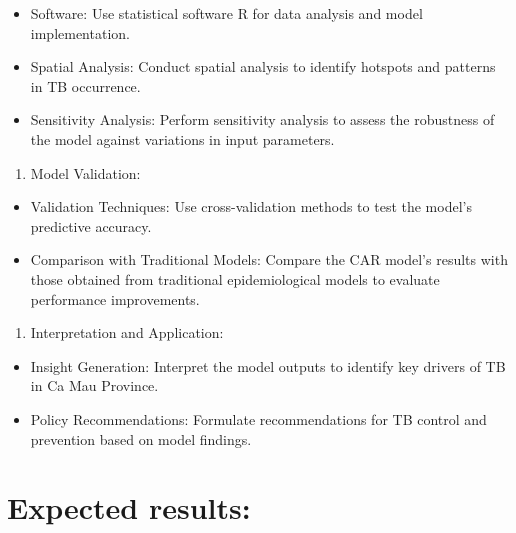 \documentclass[
  number,
  preprint,
  3p]{elsarticle}
\providecommand{\tightlist}{%
  \setlength{\itemsep}{0pt}\setlength{\parskip}{0pt}}\usepackage{longtable,booktabs,array}
\begin{document}
\begin{itemize}
\tightlist
\item
  Software: Use statistical software R for data analysis and model
  implementation.
\item
  Spatial Analysis: Conduct spatial analysis to identify hotspots and
  patterns in TB occurrence.
\item
  Sensitivity Analysis: Perform sensitivity analysis to assess the
  robustness of the model against variations in input parameters.\\
\end{itemize}

\begin{enumerate}
\def\labelenumi{\arabic{enumi}.}
\setcounter{enumi}{3}
\tightlist
\item
  Model Validation:\\
\end{enumerate}

\begin{itemize}
\tightlist
\item
  Validation Techniques: Use cross-validation methods to test the
  model's predictive accuracy.\\
\item
  Comparison with Traditional Models: Compare the CAR model's results
  with those obtained from traditional epidemiological models to
  evaluate performance improvements.\\
\end{itemize}

\begin{enumerate}
\def\labelenumi{\arabic{enumi}.}
\setcounter{enumi}{4}
\tightlist
\item
  Interpretation and Application:\\
\end{enumerate}

\begin{itemize}
\tightlist
\item
  Insight Generation: Interpret the model outputs to identify key
  drivers of TB in Ca Mau Province.\\
\item
  Policy Recommendations: Formulate recommendations for TB control and
  prevention based on model findings.
\end{itemize}

\hypertarget{expected-results}{%
\section{Expected results:}\label{expected-results}}
\end{document}
